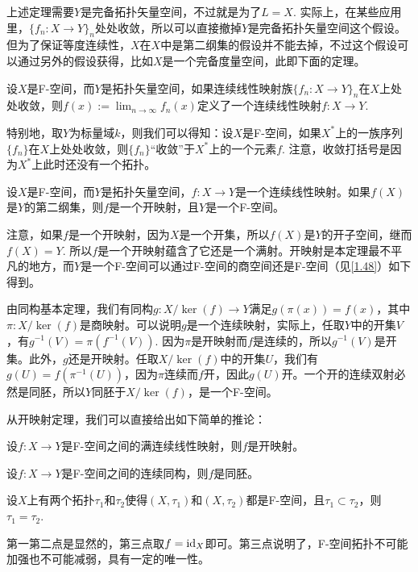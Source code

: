 上述定理需要$Y$是完备拓扑矢量空间，不过就是为了$L=X$. 实际上，在某些应用里，$\{f_n:X\to Y\}_n$处处收敛，所以可以直接撤掉$Y$是完备拓扑矢量空间这个假设。但为了保证等度连续性，$X$在$X$中是第二纲集的假设并不能去掉，不过这个假设可以通过另外的假设获得，比如$X$是一个完备度量空间，此即下面的定理。

\begin{thm}
设$X$是F-空间，而$Y$是拓扑矢量空间，如果连续线性映射族$\{f_n:X\to Y\}_n$在$X$上处处收敛，则$f(x):=\lim_{n\to \infty}f_n(x)$定义了一个连续线性映射$f:X\to Y$.
\end{thm}

特别地，取$Y$为标量域$k$，则我们可以得知：设$X$是F-空间，如果$X^*$上的一族序列$\{f_n\}$在$X$上处处收敛，则$\{f_n\}$“收敛”于$X^*$上的一个元素$f$. 注意，收敛打括号是因为$X^*$上此时还没有一个拓扑。

\begin{thm}[开映射定理]
设$X$是F-空间，而$Y$是拓扑矢量空间，$f:X\to Y$是一个连续线性映射。如果$f(X)$是$Y$的第二纲集，则$f$是一个开映射，且$Y$是一个F-空间。
\end{thm}

注意，如果$f$是一个开映射，因为$X$是一个开集，所以$f(X)$是$Y$的开子空间，继而$f(X)=Y$. 所以$f$是一个开映射蕴含了它还是一个满射。开映射是本定理最不平凡的地方，而$Y$是一个F-空间可以通过F-空间的商空间还是F-空间（见\ref{1.48}）如下得到。

由同构基本定理，我们有同构$g:X/\ker(f)\to Y$满足$g(\pi(x))=f(x)$，其中$\pi:X/\ker(f)$是商映射。可以说明$g$是一个连续映射，实际上，任取$Y$中的开集$V$，有$g^{-1}(V)=\pi(f^{-1}(V))$. 因为$\pi$是开映射而$f$是连续的，所以$g^{-1}(V)$是开集。此外，$g$还是开映射。任取$X/\ker(f)$中的开集$U$，我们有$g(U)=f(\pi^{-1}(U))$，因为$\pi$连续而$f$开，因此$g(U)$开。一个开的连续双射必然是同胚，所以$Y$同胚于$X/\ker(f)$，是一个F-空间。

从开映射定理，我们可以直接给出如下简单的推论：
\begin{compactenum}
\item 设$f:X\to Y$是F-空间之间的满连续线性映射，则$f$是开映射。
\item 设$f:X\to Y$是F-空间之间的连续同构，则$f$是同胚。
\item 设$X$上有两个拓扑$\tau_1$和$\tau_2$使得$(X,\tau_1)$和$(X,\tau_2)$都是F-空间，且$\tau_1\subset \tau_2$，则$\tau_1=\tau_2$.
\end{compactenum}

第一第二点是显然的，第三点取$f=\operatorname{id}_X$即可。第三点说明了，F-空间拓扑不可能加强也不可能减弱，具有一定的唯一性。

